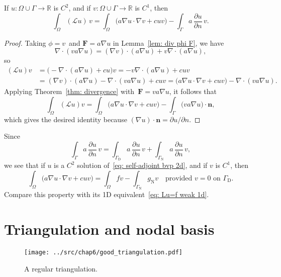 \begin{theorem}\label{thm: first Green}
If $u:\Omega\cup\Gamma\to\mathbb{R}$ is $C^2$, and if 
$v:\Omega\cup\Gamma\to\mathbb{R}$ is $C^1$, then
\[
\int_\Omega(\mathcal{L}u)\,v
	=\int_\Omega\bigl(a\nabla u\cdot\nabla v+cuv\bigr)
	-\int_\Gamma a\,\frac{\partial u}{\partial n}\,v.
\]
\end{theorem}
\begin{proof}
Taking $\phi=v$~and $\boldsymbol{F}=a\nabla u$ in Lemma~\ref{lem: div phi F}, 
we have
\[
\nabla\cdot(va\nabla u)=(\nabla v)\cdot(a\nabla u)+v\nabla\cdot(a\nabla u),
\]
so
\begin{align*}
(\mathcal{L}u)v&=\bigl(-\nabla\cdot(a\nabla u)+cu\bigr)v
	=-v\nabla\cdot(a\nabla u)+cuv\\
	&=(\nabla v)\cdot(a\nabla u)-\nabla\cdot(va\nabla u)+cuv
	=\bigl(a\nabla u\cdot\nabla v+cuv)-\nabla\cdot(va\nabla u).
\end{align*}
Applying Theorem~\ref{thm: divergence} with~$\boldsymbol{F}=va\nabla u$, it 
follows that
\[
\int_\Omega(\mathcal{L}u)v=\int_\Omega\bigl(a\nabla u\cdot\nabla v+cuv\bigr)
	-\int_\Gamma\boldsymbol(va\nabla u)\cdot\boldsymbol{n},
\]
which gives the desired identity because 
$(\nabla u)\cdot\boldsymbol{n}=\partial u/\partial n$.
\end{proof}

Since 
\[
\int_\Gamma a\,\frac{\partial u}{\partial n}\,v
	=\int_{\Gamma_{\mathrm{D}}} a\,\frac{\partial u}{\partial n}\,v
	+\int_{\Gamma_{\mathrm{N}}} a\,\frac{\partial u}{\partial n}\,v,
\]
we see that if $u$ is a $C^2$ solution of~\eqref{eq: self-adjoint bvp 2d}, and 
if $v$ is $C^1$, then
\begin{equation}\label{eq: Lu=f weak 2d}
\int_\Omega\bigl(a\nabla u\cdot\nabla v+cuv\bigr)=\int_\Omega fv
	-\int_{\Gamma_{\mathrm{N}}}g_{\mathrm{N}}v
	\quad\text{provided $v=0$ on $\Gamma_{\mathrm{D}}$.}
\end{equation}
Compare this property with its 1D equivalent~\eqref{eq: Lu=f weak 1d}.

\section{Triangulation and nodal basis}\label{sec: triangulation}

\begin{figure}
\caption{A regular triangulation.}\label{fig: good Th}
\begin{center}
\texttt{[image: ../src/chap6/good\_triangulation.pdf]} 
\end{center}
\end{figure}

